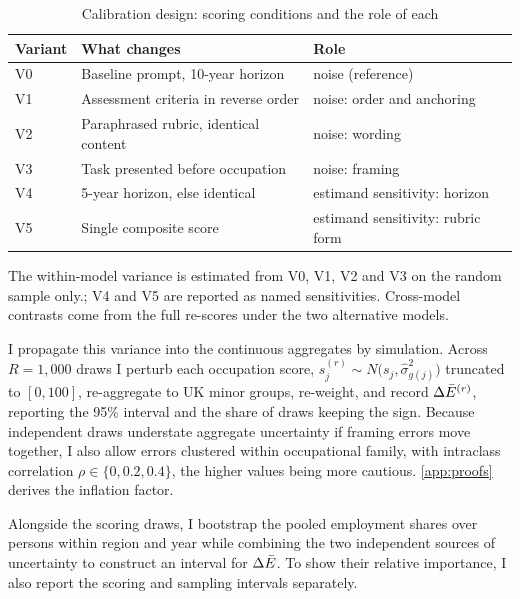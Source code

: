 \begin{table}[t]
\centering
\caption{Calibration design: scoring conditions and the role of each}
\label{tab:calibration}
\small
\begin{tabular}{lll}
\toprule
Variant & What changes & Role \\
\midrule
V0 & Baseline prompt, 10-year horizon & noise (reference) \\
V1 & Assessment criteria in reverse order & noise: order and anchoring \\
V2 & Paraphrased rubric, identical content & noise: wording \\
V3 & Task presented before occupation & noise: framing \\
V4 & 5-year horizon, else identical & estimand sensitivity: horizon \\
V5 & Single composite score & estimand sensitivity: rubric form \\
\bottomrule
\end{tabular}
\begin{minipage}{0.92\textwidth}
\vspace{0.4em}\footnotesize
The within-model variance is estimated from V0, V1, V2 and V3 on the random sample only.; V4 and V5 are reported as named sensitivities. Cross-model contrasts come from the full re-scores under the two alternative models.
\end{minipage}
\end{table}

I propagate this variance into the continuous aggregates by simulation. Across $R = 1{,}000$ draws I perturb each occupation score, $s^{(r)}_j \sim N\bigl(s_j, \widehat{\sigma}^2_{g(j)}\bigr)$ truncated to $[0,100]$, re-aggregate to UK minor groups, re-weight, and record $\Delta\bar{E}^{(r)}$, reporting the 95\% interval and the share of draws keeping the sign. Because independent draws understate aggregate uncertainty if framing errors move together, I also allow errors clustered within occupational family, with intraclass correlation $\rho \in \{0, 0.2, 0.4\}$, the higher values being more cautious. \cref{app:proofs} derives the inflation factor.

Alongside the scoring draws, I bootstrap the pooled employment shares over persons within region and year while combining the two independent sources of uncertainty to construct an interval for $\Delta\bar{E}$. To show their relative importance, I also report the scoring and sampling intervals separately.

